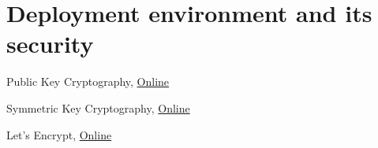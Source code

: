 \documentclass[a4paper,12pt,oneside,openright]{memoir}
\begin{document}
\section*{Deployment environment and its security}\label{sec:04}

%
%
\begin{thebibliography}{5}

 Public Key Cryptography,
\href{http://en.wikipedia.org/wiki/Public-key_cryptography}{Online}

 Symmetric Key Cryptography,
\href{http://en.wikipedia.org/wiki/Symmetric-key_algorithm}{Online}

 Let's Encrypt,
\href{https://letsencrypt.org}{Online}

\end{thebibliography}
%
\end{document}
